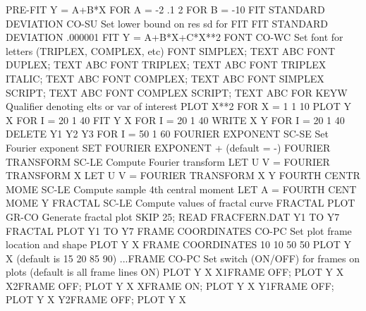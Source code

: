                                   PRE-FIT Y = A+B*X FOR A = -2 .1 2 FOR B = -10
FIT STANDARD DEVIATION      CO-SU Set lower bound on res sd for FIT
                                  FIT STANDARD DEVIATION .000001
                                  FIT Y = A+B*X+C*X**2
FONT                        CO-WC Set font for letters (TRIPLEX, COMPLEX, etc)
                                  FONT SIMPLEX; TEXT ABC
                                  FONT DUPLEX; TEXT ABC
                                  FONT TRIPLEX; TEXT ABC
                                  FONT TRIPLEX ITALIC; TEXT ABC
                                  FONT COMPLEX; TEXT ABC
                                  FONT SIMPLEX SCRIPT; TEXT ABC
                                  FONT COMPLEX SCRIPT; TEXT ABC
FOR                         KEYW  Qualifier denoting elts or var of interest
                                  PLOT X**2 FOR X = 1 1 10
                                  PLOT Y X FOR I = 20 1 40
                                  FIT Y X FOR I = 20 1 40
                                  WRITE X Y FOR I = 20 1 40
                                  DELETE Y1 Y2 Y3 FOR I = 50 1 60
FOURIER EXPONENT            SC-SE Set Fourier exponent
                                  SET FOURIER EXPONENT +
                                  (default = -)
FOURIER TRANSFORM           SC-LE Compute Fourier transform
                                  LET U V = FOURIER TRANSFORM X
                                  LET U V = FOURIER TRANSFORM X Y
FOURTH CENTR MOME           SC-LE Compute sample 4th central moment
                                  LET A = FOURTH CENT MOME Y
FRACTAL                     SC-LE Compute values of fractal curve
FRACTAL PLOT                GR-CO Generate fractal plot
                                  SKIP 25; READ FRACFERN.DAT Y1 TO Y7
                                  FRACTAL PLOT Y1 TO Y7
FRAME COORDINATES           CO-PC Set plot frame location and shape
                                  PLOT Y X
                                  FRAME COORDINATES 10 10 50 50
                                  PLOT Y X
                                  (default is   15 20    85 90)
...FRAME                    CO-PC Set switch (ON/OFF) for frames on plots
                                  (default is all frame lines   ON)
                                  PLOT Y X
                                  X1FRAME OFF; PLOT Y X
                                  X2FRAME OFF; PLOT Y X
                                  XFRAME ON; PLOT Y X
                                  Y1FRAME OFF; PLOT Y X
                                  Y2FRAME OFF; PLOT Y X
